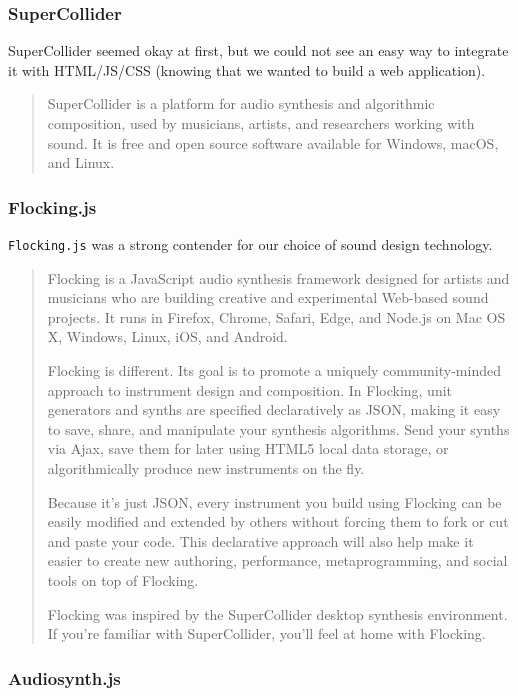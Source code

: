 \documentclass[12pt,a4paper]{article}
\newcommand{\lightcode}[1]{\colorbox{light-gray}{\texttt{#1}}}
\begin{document}
\subsubsection{SuperCollider}
SuperCollider seemed okay at first, but we could not see an easy way to integrate it with HTML/JS/CSS (knowing that we wanted to build a web application).

\begin{quote}
SuperCollider is a platform for audio synthesis and algorithmic composition, used by musicians, artists, and researchers working with sound. It is free and open source software available for Windows, macOS, and Linux. \cite{supercollider}
\end{quote}

\subsubsection{Flocking.js}
\lightcode{Flocking.js} was a strong contender for our choice of sound design technology.

\begin{quote}
Flocking is a JavaScript audio synthesis framework designed for artists and musicians who are building creative and experimental Web-based sound projects. It runs in Firefox, Chrome, Safari, Edge, and Node.js on Mac OS X, Windows, Linux, iOS, and Android.

Flocking is different. Its goal is to promote a uniquely community-minded approach to instrument design and composition. In Flocking, unit generators and synths are specified declaratively as JSON, making it easy to save, share, and manipulate your synthesis algorithms. Send your synths via Ajax, save them for later using HTML5 local data storage, or algorithmically produce new instruments on the fly.

Because it's just JSON, every instrument you build using Flocking can be easily modified and extended by others without forcing them to fork or cut and paste your code. This declarative approach will also help make it easier to create new authoring, performance, metaprogramming, and social tools on top of Flocking.

Flocking was inspired by the SuperCollider desktop synthesis environment. If you're familiar with SuperCollider, you'll feel at home with Flocking. \cite{flocking}
\end{quote}

\subsubsection{Audiosynth.js}
\end{document}
